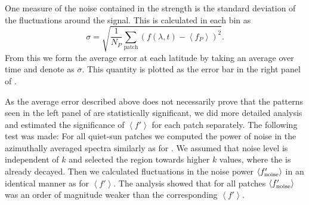 \documentclass{aa}
\begin{document}
One measure of the noise contained in the \fff strength is the standard deviation of the fluctuations
around the signal. This is calculated in each bin as
\begin{equation}
\sigma= \sqrt{\frac{1}{N_P}\sum_{\mbox{patch}} ( f(\lambda,t)
- \left<f_P\right>)^2}.
\end{equation}
From this we form the average error at each latitude by taking an average over time and denote as $\overline{\sigma}$. 
This quantity is plotted as the error bar in the right panel of .

As the average error described above does not necessarily prove that the patterns seen in the left panel of  are statistically significant, we did more detailed analysis and estimated the significance of $\left< f' \right>$ for each patch separately. The following test was made: For all quiet-sun patches we computed the power of noise in the azimuthally averaged spectra similarly as for \fff. We assumed that noise level is independent of $k$ and selected the region towards higher $k$ values, where the \fff is already decayed. Then we calculated fluctuations in the noise power $\left< f'_{\rm noise} \right>$ in an identical manner as for $\left< f' \right>$.
The analysis showed that for all patches $\left< f'_{\rm noise} \right>$ was an order of magnitude weaker than the corresponding $\left< f' \right>$.





\end{document}

